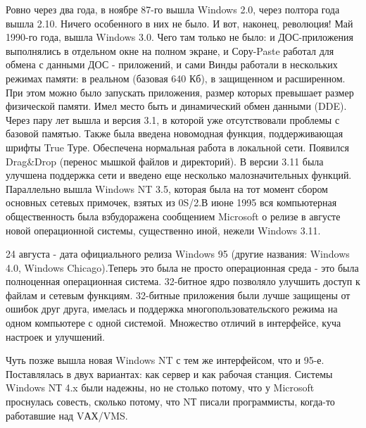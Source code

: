 Ровно через два года, в ноябре 87-го вышла Windows 2.0, через полтора года вышла 2.10. Ничего особенного в них не было. И вот, наконец, революция! Май 1990-го года, вышла Windows 3.0. Чего там только не было: и ДОС-приложения выполнялись в отдельном окне на полном экране, и Сору-Paste работал для обмена с данными ДОС - приложений, и сами Винды работали в нескольких режимах памяти: в реальном (базовая 640 Кб), в защищенном и расширенном. При этом можно было запускать приложения, размер которых превышает размер физической памяти. Имел место быть и динамический обмен данными (DDE). Через пару лет вышла и версия 3.1, в которой уже отсутствовали проблемы с базовой памятью. Также была введена новомодная функция, поддерживающая шрифты True Туре. Обеспечена нормальная работа в локальной сети. Появился Drag\&Drop (перенос мышкой файлов и директорий). В версии 3.11 была улучшена поддержка сети и введено еще несколько малозначительных функций. Параллельно вышла Windows NT 3.5, которая была на тот момент сбором основных сетевых примочек, взятых из 0S/2.В июне 1995 вся компьютерная общественность была взбудоражена сообщением Microsoft о релизе в августе новой операционной системы, существенно иной, нежели Windows 3.11.

24 августа - дата официального релиза Windows 95 (другие названия: Windows 4.0, Windows Chicago).Теперь это была не просто операционная среда - это была полноценная операционная система. 32-битное ядро позволяло улучшить доступ к файлам и сетевым функциям. 32-битные приложения были лучше защищены от ошибок друг друга, имелась и поддержка многопользовательского режима на одном компьютере с одной системой. Множество отличий в интерфейсе, куча настроек и улучшений.

Чуть позже вышла новая Windows NT с тем же интерфейсом, что и 95-е. Поставлялась в двух вариантах: как сервер и как рабочая станция. Системы Windows NТ 4.x были надежны, но не столько потому, что у Microsoft проснулась совесть, сколько потому, что NТ писали программисты, когда-то работавшие над VАХ/VMS.

